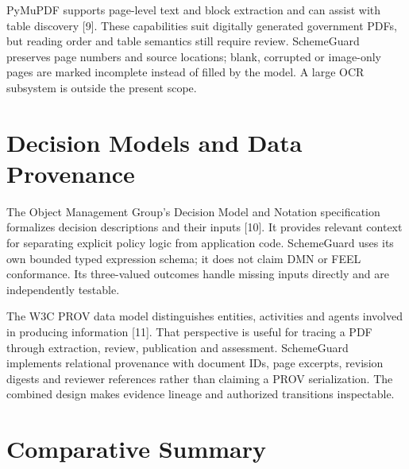 \documentclass[12pt,a4paper,twoside]{report}
\begin{document}
PyMuPDF supports page-level text and block extraction and can assist with table discovery [9]. These capabilities suit digitally generated government PDFs, but reading order and table semantics still require review. SchemeGuard preserves page numbers and source locations; blank, corrupted or image-only pages are marked incomplete instead of filled by the model. A large OCR subsystem is outside the present scope.

\section{Decision Models and Data Provenance}

The Object Management Group's Decision Model and Notation specification formalizes decision descriptions and their inputs [10]. It provides relevant context for separating explicit policy logic from application code. SchemeGuard uses its own bounded typed expression schema; it does not claim DMN or FEEL conformance. Its three-valued outcomes handle missing inputs directly and are independently testable.

The W3C PROV data model distinguishes entities, activities and agents involved in producing information [11]. That perspective is useful for tracing a PDF through extraction, review, publication and assessment. SchemeGuard implements relational provenance with document IDs, page excerpts, revision digests and reviewer references rather than claiming a PROV serialization. The combined design makes evidence lineage and authorized transitions inspectable.

\section{Comparative Summary}
\end{document}
